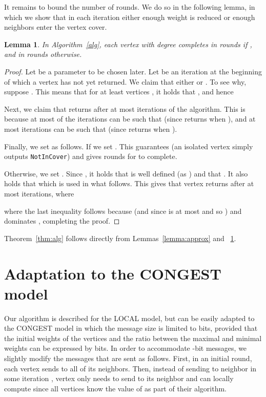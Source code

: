 \documentclass[11pt]{article}
\newtheorem{lemma}[theorem]{Lemma}
\newcommand{\NotInCover}{\texttt{NotInCover}}
\begin{document}
It remains to bound the number of rounds. We do so in the following lemma, in which we show that in each iteration either enough weight is reduced or enough neighbors enter the vertex cover.
\begin{lemma}
\label{lemma:complexity}
In Algorithm~\ref{alg}, each vertex  with degree  completes in  rounds if , and in  rounds otherwise.
\end{lemma}
\begin{proof}
Let  be a parameter to be chosen later. Let  be an iteration at the beginning of which a vertex  has not yet returned. We claim that either
 or . To see why, suppose . This means that for at least  vertices , it holds that , and hence


Next, we claim that  returns after at most  iterations of the algorithm. This is because at most  of the iterations  can be such that  (since  returns when ), and at most  iterations  can be such that  (since  returns when ).

Finally, we set  as follows. If  we set . This guarantees  (an isolated vertex simply outputs \NotInCover) and gives  rounds for  to complete.

Otherwise, we set . Since , it holds that  is well defined (as ) and that . It also holds that  which is used in what follows.
This gives that vertex  returns after at most  iterations, where

where the last inequality follows because  (and since  is at most  and so ) and  dominates , completing the proof.
\end{proof}

Theorem~\ref{thm:alg} follows directly from Lemmas~\ref{lemma:approx} and ~\ref{lemma:complexity}.

\section{Adaptation to the CONGEST model}
\label{sec:discussion}
Our algorithm is described for the LOCAL model, but can be easily adapted to the CONGEST model in which the message size is limited to  bits, provided that the initial weights of the vertices and the ratio between the maximal and minimal weights can be expressed by  bits. In order to accommodate -bit messages, we slightly modify the messages that are sent as follows. First, in an initial round, each vertex  sends  to all of its neighbors. Then, instead of sending  to neighbor  in some iteration , vertex  only needs to send  to its neighbor  and  can locally compute  since all vertices know the value of  as part of their algorithm.
\end{document}
